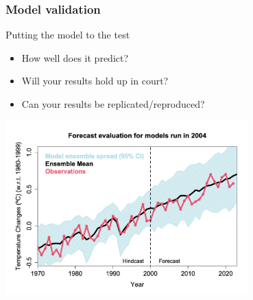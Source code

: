 \documentclass[color=usenames,dvipsnames]{beamer}\usepackage[]{graphicx}\usepackage[]{xcolor}
\begin{document}
\begin{frame}
  \frametitle{Model validation}
  \large
  {%
    Putting the model to the test}
  \begin{itemize}[<+->]
    \item How well does it predict?
    \item Will your results hold up in court?
    \item Can your results be replicated/reproduced?
    \end{itemize}
  \pause
  \vfill
  \centering
  \includegraphics[width=0.7\textwidth]{figs/nasa-prediction} \\
\end{frame}


\end{document}

